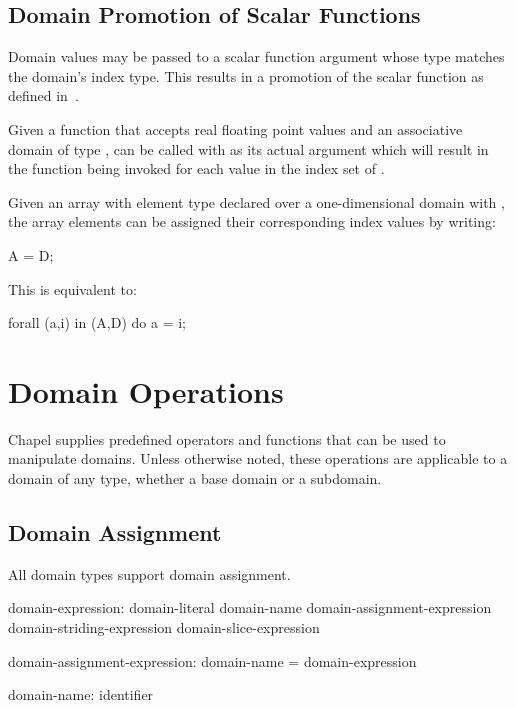 \subsection{Domain Promotion of Scalar Functions}
\label{Domain_Promotion_of_Scalar_Functions}

Domain values may be passed to a scalar function argument whose type
matches the domain's index type.  This results in a promotion of the
scalar function as defined in~.

\begin{example}
Given a function  that accepts real floating point values
and an associative domain  of
type ,  can be called with  as
its actual argument which will result in the function being invoked
for each value in the index set of .
\end{example}

\begin{example}
Given an array  with element type  declared over a
one-dimensional domain  with  , the
array elements can be assigned their corresponding index values by
writing:
\begin{chapel}
A = D;
\end{chapel}
This is equivalent to:
\begin{chapel}
forall (a,i) in (A,D) do
  a = i;
\end{chapel}
\end{example}


\section{Domain Operations}

Chapel supplies predefined operators and functions that can be used to manipulate
domains.  Unless otherwise noted, these operations are applicable to a domain of
any type, whether a base domain or a subdomain.

\subsection{Domain Assignment}
\label{Domain_Assignment}

All domain types support domain assignment.  

\begin{syntax}
domain-expression:
  domain-literal
  domain-name
  domain-assignment-expression
  domain-striding-expression
  domain-slice-expression


domain-assignment-expression:
  domain-name = domain-expression

domain-name:
  identifier
\end{syntax}

